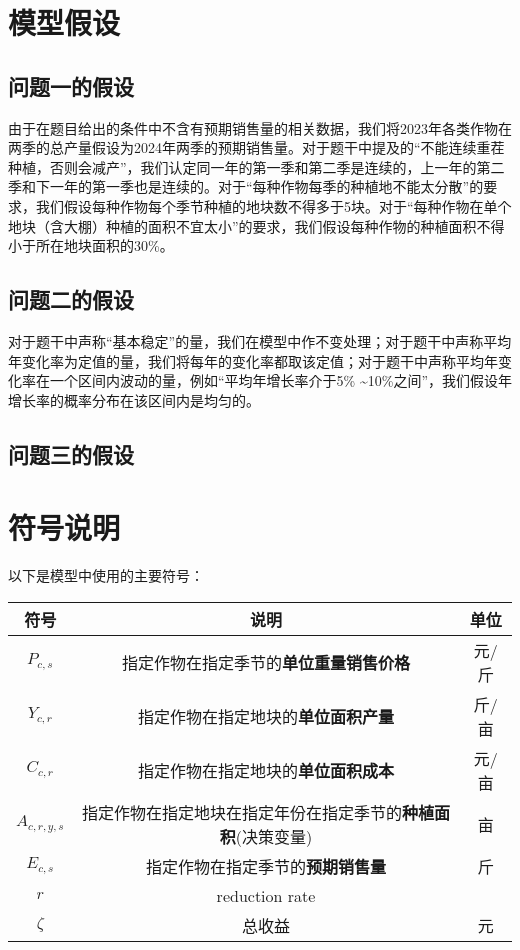 \documentclass{cumcmthesis}
\begin{document}
\section{模型假设}
\subsection{问题一的假设}
由于在题目给出的条件中不含有预期销售量的相关数据，我们将2023年各类作物在两季的总产量假设为2024年两季的预期销售量。对于题干中提及的“不能连续重茬种植，否则会减产”，我们认定同一年的第一季和第二季是连续的，上一年的第二季和下一年的第一季也是连续的。对于“每种作物每季的种植地不能太分散”的要求，我们假设每种作物每个季节种植的地块数不得多于5块。对于“每种作物在单个地块（含大棚）种植的面积不宜太小”的要求，我们假设每种作物的种植面积不得小于所在地块面积的30\%。
\subsection{问题二的假设}
对于题干中声称“基本稳定”的量，我们在模型中作不变处理；对于题干中声称平均年变化率为定值的量，我们将每年的变化率都取该定值；对于题干中声称平均年变化率在一个区间内波动的量，例如“平均年增长率介于5\% \textasciitilde 10\%之间”，我们假设年增长率的概率分布在该区间内是均匀的。
\subsection{问题三的假设}


\section{符号说明}
以下是模型中使用的主要符号：
\begin{table}[!htbp]
    \begin{tabular}{ccc}
        \toprule[1.5pt]
        符号 & 说明 & 单位\\
        \midrule[1pt]
        $P_{c,s}$ & 指定作物在指定季节的\textbf{单位重量销售价格} & 元/斤 \\
        $Y_{c,r}$ & 指定作物在指定地块的\textbf{单位面积产量} & 斤/亩\\
        $C_{c,r}$ & 指定作物在指定地块的\textbf{单位面积成本} & 元/亩\\
        $A_{c,r,y,s}$ & 指定作物在指定地块在指定年份在指定季节的\textbf{种植面积}(决策变量) & 亩\\
        $E_{c,s}$ & 指定作物在指定季节的\textbf{预期销售量} & 斤\\
        $r$ & reduction rate & \\
        
        $\zeta$ & 总收益 & 元\\
        \bottomrule[1.5pt]
    \end{tabular}
\end{table}
\end{document}
